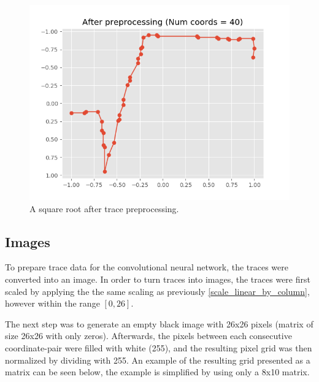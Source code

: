 \begin{figure}[H]
    \centering
    \includegraphics[width=\linewidth,keepaspectratio]{Assets/Chapter3_Method/sqrt_after_preprocessing.png}
    \caption{A square root after trace preprocessing.}
    \label{fig:sqrt_processed}
\end{figure}

\subsection{Images}

To prepare trace data for the convolutional neural network, the traces were converted into an image. In order to turn traces into images, the traces were first scaled by applying the the same scaling as previously \ref{scale_linear_by_column}, however within the range $[0, 26]$.

The next step was to generate an empty black image with 26x26 pixels (matrix of size 26x26 with only zeros). Afterwards, the pixels between each consecutive coordinate-pair were filled with white (255), and the resulting pixel grid was then normalized by dividing with 255. An example of the resulting grid presented as a matrix can be seen below, the example is simplified by using only a 8x10 matrix.

